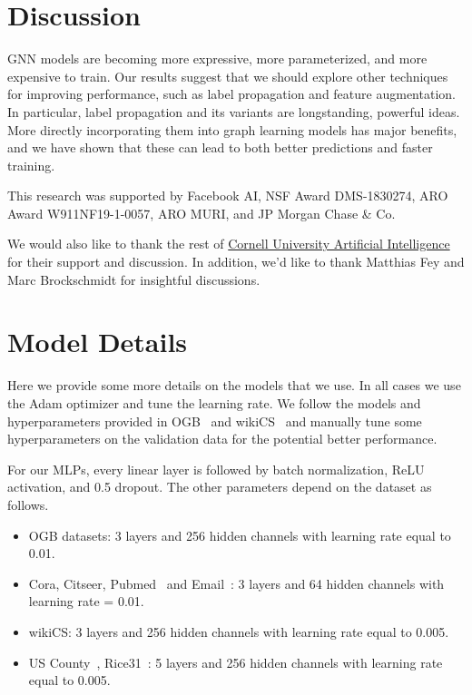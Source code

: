 \documentclass{article}
\newcommand{\xhdr}[1]{\vspace{0.0mm}\noindent{\textbf{#1.}}\hspace{0.5mm}}
\begin{document}
\section{Discussion}
GNN models are becoming more expressive, more parameterized, and more expensive to train.
Our results suggest that we should explore other techniques for improving performance,
such as label propagation and feature augmentation.
In particular, label propagation and its variants are longstanding, powerful ideas.
More directly incorporating them into graph learning models has major benefits,
and we have shown that these can lead to both better predictions and faster training.


\bigskip
\xhdr{Acknowledgments}
This research was supported by Facebook AI, 
NSF Award DMS-1830274, ARO Award W911NF19-1-0057, ARO MURI, and JP Morgan Chase \& Co.

We would also like to thank the rest of \href{https://cuai.github.io/}{Cornell University Artificial Intelligence} for their support and discussion. In addition, we'd like to thank Matthias Fey and Marc Brockschmidt for insightful discussions.




\appendix

\section{Model Details}

Here we provide some more details on the models that we use.
In all cases we use the Adam optimizer and tune the learning rate.
We follow the models and hyperparameters provided in OGB~\citep{Hu2020OpenGB} and wikiCS~\citep{Mernyei2020WikiCSAW}
and manually tune some hyperparameters on the validation data for the potential better performance.

For our MLPs, every linear layer is followed by batch normalization, ReLU activation, and 0.5 dropout.
The other parameters depend on the dataset as follows.
\begin{itemize}
    \item OGB datasets: 3 layers and 256 hidden channels with learning rate equal to 0.01.
    
\item Cora, Citseer, Pubmed~\citep{getoor2001learning,getoor2005link,namata2012query} and Email~\citep{leskovec2007graph,yin2017local}: 3 layers and 64 hidden channels with learning rate = 0.01.

\item wikiCS: 3 layers and 256 hidden channels with learning rate equal to 0.005.

\item US County~\citep{Jia-2020-GNNR}, Rice31~\citep{Traud2011SocialSO}: 5 layers and 256 hidden channels with learning rate equal to 0.005.
\end{itemize}
\end{document}
